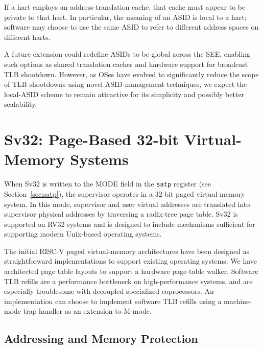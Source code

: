 If a hart employs an address-translation cache, that cache must appear to be
private to that hart.
In particular, the meaning of an ASID is local to a hart; software may choose
to use the same ASID to refer to different address spaces on different harts.

\begin{commentary}
A future extension could redefine ASIDs to be global across the SEE, enabling
such options as shared translation caches and hardware support for broadcast
TLB shootdown.
However, as OSes have evolved to significantly reduce the scope of TLB
shootdowns using novel ASID-management techniques, we expect the local-ASID
scheme to remain attractive for its simplicity and possibly better
scalability.
\end{commentary}

\section{Sv32: Page-Based 32-bit Virtual-Memory Systems}
\label{sec:sv32}

When Sv32 is written to the MODE field in the {\tt satp} register (see
Section~\ref{sec:satp}), the supervisor operates in a 32-bit paged
virtual-memory system.  In this mode, supervisor and user virtual addresses
are translated into supervisor physical addresses by traversing a radix-tree
page table.  Sv32 is supported on RV32 systems and is designed to include
mechanisms sufficient for supporting modern Unix-based operating systems.

\begin{commentary}
The initial RISC-V paged virtual-memory architectures have been
designed as straightforward implementations to support existing
operating systems.  We have architected page table layouts to support
a hardware page-table walker.  Software TLB refills are a performance
bottleneck on high-performance systems, and are especially troublesome
with decoupled specialized coprocessors.  An implementation can choose
to implement software TLB refills using a machine-mode trap handler as
an extension to M-mode.
\end{commentary}

\subsection{Addressing and Memory Protection}
\label{sec:translation}

